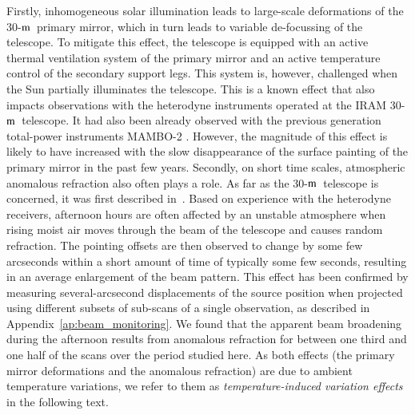 \documentclass[traditionalabstract]{aa}
\newcommand{\trentemetre}{30-$\rm{m}$}
\newcommand{\lp}[1]{#1}
\begin{document}
{Firstly, inhomogeneous solar illumination leads to large-scale deformations of the
\trentemetre\ primary mirror, which in turn leads to variable de-focussing of the
telescope. {\lp To mitigate this effect, the telescope is equipped with an
  active thermal ventilation system of the primary mirror and an active
  temperature control of the secondary support legs. This system is, however,
  challenged when the Sun partially illuminates the telescope.}
  {\lp This is a known effect that also impacts
  observations with the heterodyne instruments operated at the IRAM
  \trentemetre\ telescope. It had also been already observed with the previous
  generation total-power instruments MAMBO-2 \citep{Kreysa1999}.} However, the
magnitude of this effect is likely to have increased with the slow disappearance
of the surface painting of the primary mirror in the past few years.
Secondly, on short time scales, atmospheric anomalous refraction {\lp also often plays a
  role.} As far as the \trentemetre\ telescope is concerned, it was first
described in~\citet{Altenhoff1987}. Based on experience with
  the heterodyne receivers, afternoon hours are
  often affected by an unstable atmosphere when rising moist air moves
  through the beam of the telescope and causes random refraction. The pointing offsets
  are then observed to change by some few arcseconds within a short amount of time of typically some few seconds, {\lp resulting in an average
    enlargement of the beam pattern.} This effect has been confirmed by
  measuring several-arcsecond displacements of the source position when projected using
  different subsets of sub-scans of a single observation, as described
  in Appendix~\ref{ap:beam_monitoring}. We found that the apparent beam broadening during
  the afternoon results from anomalous refraction for between one third
  and one half of the scans over the period studied here.
{\lp As both effects (the primary mirror deformations and the anomalous
  refraction) are due to ambient temperature variations, we refer to them as
  \emph{temperature-induced variation effects} in the following text.}\\

}
\end{document}
